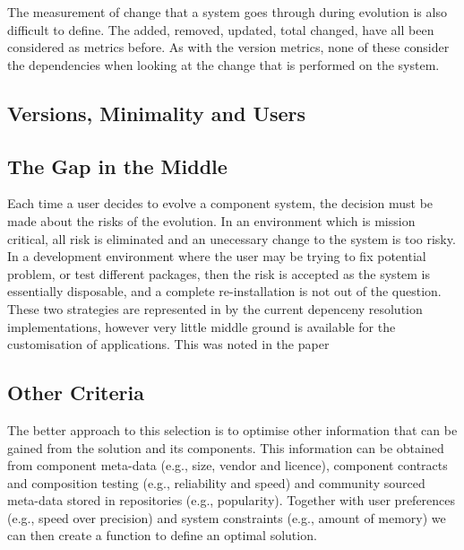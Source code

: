 The measurement of change that a system goes through during evolution is also difficult to define.
The added, removed, updated, total changed, have all been considered as metrics before. 
As with the version metrics, none of these consider the dependencies when looking at the change that is performed on the system.

\subsection{Versions, Minimality and Users}

\subsection{The Gap in the Middle}
Each time a user decides to evolve a component system, the decision must be made about the risks of the evolution.
In an environment which is mission critical, all risk is eliminated and an unecessary change to the system is too risky.
In a development environment where the user may be trying to fix potential problem, 
or test different packages, then the risk is accepted as the system is essentially disposable, and a complete re-installation is not out of the question.
These two strategies are represented in by the current depenceny resolution implementations, however very little middle ground is available for the customisation of applications.
This was noted in the paper %

\subsection{Other Criteria}
The better approach to this selection is to optimise other information that can be gained from the solution and its components. 
This information can be obtained from component meta-data (e.g., size, vendor and licence),
component contracts and composition testing (e.g., reliability and speed) and community sourced meta-data stored in repositories (e.g., popularity).
Together with user preferences (e.g., speed over precision) and system constraints (e.g., amount of memory) 
we can then create a function to define an optimal solution.


